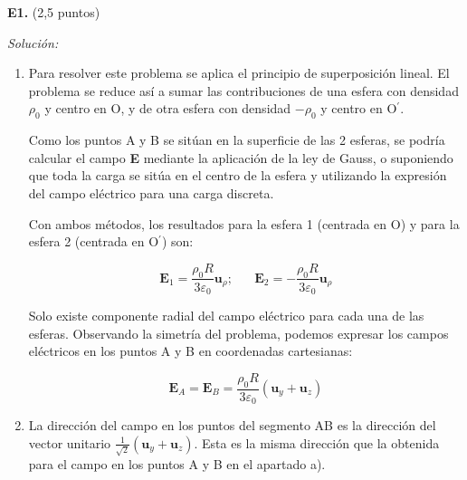 \textbf{E1.} (2,5 puntos)

\usetikzlibrary{calc,patterns,angles,quotes}


\vspace{20px}
\textit{Solución:}
\\

\begin{enumerate}
[label=\alph*)]
    \item Para resolver este problema se aplica el principio de superposición lineal. El problema se reduce así
    a sumar las contribuciones de una esfera con densidad $\rho_0$ y centro en O, y de otra esfera
    con densidad $-\rho_0$ y centro en O$^\prime$.

    Como los puntos A y B se sitúan en la superficie de las 2 esferas, se podría calcular el campo \textbf{E} mediante
    la aplicación de la ley de Gauss, o suponiendo que toda la carga se sitúa en el centro de la esfera y
    utilizando la expresión del campo eléctrico para una carga discreta.

    Con ambos métodos, los resultados para la esfera 1 (centrada en O) y para la esfera 2 (centrada en O$^\prime$) son:

    \begin{equation*}
        \mathbf{E}_1 = \frac{\rho_0 R}{3 \varepsilon_0} \mathbf{u}_{\rho}; \hspace{20pt}
        \mathbf{E}_2 = - \frac{\rho_0 R}{3 \varepsilon_0} \mathbf{u}_{\rho}
    \end{equation*}

    Solo existe componente radial del campo eléctrico para cada una de las esferas. Observando la simetría del
    problema, podemos expresar los campos eléctricos en los puntos A y B en coordenadas cartesianas:

    \begin{equation*}
        \mathbf{E}_A =  \mathbf{E}_B = \frac{\rho_0 R}{3 \varepsilon_0} (\mathbf{u}_y + \mathbf{u}_z )
    \end{equation*}


    \vspace{20px}
    \item La dirección del campo en los puntos del segmento AB es la dirección del vector unitario $\frac{1}{\sqrt{2}}(\mathbf{u}_y + \mathbf{u}_z)$.
    Esta es la misma dirección que la obtenida para el campo en los
    puntos A y B en el apartado a).


\end{enumerate}
